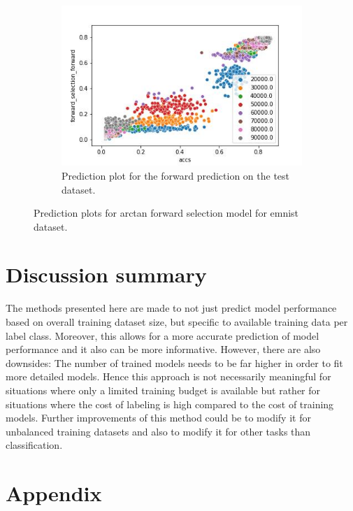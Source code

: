 \documentclass{article} %
\begin{document}
\begin{figure}
\begin{subfigure}{.33\textwidth}
        \includegraphics[width=.98\linewidth]{emnist/arctan_all_epochs_forward_selection_train.jpg}
        \caption{Prediction plot for the forward prediction on the test dataset.}
        \label{fig:emnist_prediction_plot_val}
    \end{subfigure}
    \caption{Prediction plots for arctan forward selection model for emnist dataset.}
    \label{fig:emnist_prediction_plot}
\end{figure}

\section{Discussion summary}

The methods presented here are made to not just predict model performance based on overall training dataset size, but specific to available training data per label class.
Moreover, this allows for a more accurate prediction of model performance and it also can be more informative.
However, there are also downsides: The number of trained models needs to be far higher in order to fit more detailed models.
Hence this approach is not necessarily meaningful for situations where only a limited training budget is available but rather for situations where the cost of labeling is high compared to the cost of training models.
Further improvements of this method could be to modify it for unbalanced training datasets and also to modify it for other tasks than classification.

\pagebreak



\section*{Appendix}
\end{document}

